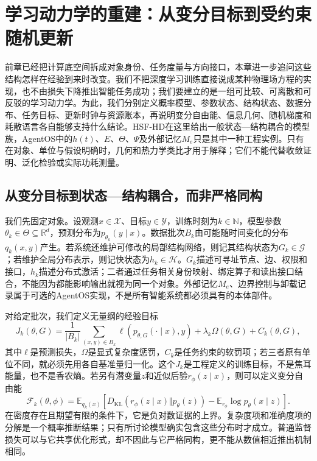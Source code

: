 \chapter{学习动力学的重建：从变分目标到受约束随机更新}
\label{chp:dynamical_reconstruction}

前章已经把计算底空间拆成对象身份、任务度量与方向接口，本章进一步追问这些结构怎样在经验到来时改变。我们不把深度学习训练直接说成某种物理场方程的实现，也不由损失下降推出智能任务成功；我们要建立的是一组可比较、可离散和可反驳的学习动力学。为此，我们分别定义概率模型、参数状态、结构状态、数据分布、任务目标、更新时钟与资源账本，再说明变分自由能、信息几何、随机梯度和耗散语言各自能够支持什么结论。HSF-HD在这里给出一般状态—结构耦合的模型族，AgentOS中的$h(t)$、$E$、$\Theta$、$\Psi$及外部记忆$M_e$只是其中一种工程实例。只有在对象、单位与假设明确时，几何和热力学类比才用于解释；它们不能代替收敛证明、泛化检验或实际功耗测量。

\section{从变分目标到状态—结构耦合，而非严格同构}
\label{sec:free_energy_hsf_hd}

我们先固定对象。设观测$x\in\mathcal X$、目标$y\in\mathcal Y$，训练时刻为$k\in\mathbb N$，模型参数$\theta_k\in\Theta\subseteq\mathbb R^d$，预测分布为$p_{\theta_k}(y\mid x)$。数据批次$B_k$由可能随时间变化的分布$q_k(x,y)$产生。若系统还维护可修改的局部结构网络，则记其结构状态为$G_k\in\mathcal G$；若维护全局分布表示，则记快状态为$h_k\in\mathcal H$。$G_k$描述可寻址节点、边、权限和接口，$h_k$描述分布式激活；二者通过任务相关身份映射、绑定算子和读出接口结合，不能因为都能影响输出就视为同一个对象。外部记忆$M_e$、边界控制与卸载记录属于可选的AgentOS实现，不是所有智能系统都必须具有的本体部件。

对给定批次，我们定义无量纲的经验目标
\begin{equation}
J_k(\theta,G)=\frac{1}{|B_k|}\sum_{(x,y)\in B_k}\ell\!\left(p_{\theta,G}(\cdot\mid x),y\right)+\lambda_k\Omega(\theta,G)+C_k(\theta,G),
\end{equation}
其中$\ell$是预测损失，$\Omega$是显式复杂度惩罚，$C_k$是任务约束的软罚项；若三者原有单位不同，就必须先用各自基准量归一化。这个$J_k$是工程定义的训练目标，不是焦耳能量，也不是香农熵。若另有潜变量$z$和近似后验$r_\phi(z\mid x)$，则可以定义变分自由能
\begin{equation}
\mathcal F_k(\theta,\phi)=\mathbb E_{q_k(x)}\!\left[D_{\mathrm{KL}}\!\left(r_\phi(z\mid x)\Vert p_\theta(z)\right)-\mathbb E_{r_\phi}\log p_\theta(x\mid z)\right].
\end{equation}
在密度存在且期望有限的条件下，它是负对数证据的上界。复杂度项和准确度项的分解是一个概率推断结果；只有所讨论模型确实包含这些分布时才成立。普通监督损失可以与它共享优化形式，却不因此与它严格同构，更不能从数值相近推出机制相同。

